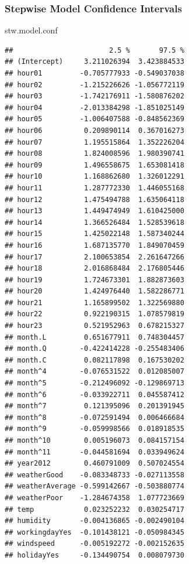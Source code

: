\documentclass[american,]{article}
\newenvironment{Shaded}{\begin{snugshade}}{\end{snugshade}}
\newcommand{\NormalTok}[1]{#1}
\begin{document}
\newpage

\hypertarget{stepwise-model-confidence-intervals}{%
\subsubsection{Stepwise Model Confidence Intervals}\label{stepwise-model-confidence-intervals}}

\begin{Shaded}
\begin{Highlighting}[]
\NormalTok{stw.model.conf}
\end{Highlighting}
\end{Shaded}

\begin{verbatim}
##                       2.5 %       97.5 %
## (Intercept)     3.211026394  3.423884533
## hour01         -0.705777933 -0.549037038
## hour02         -1.215226626 -1.056772119
## hour03         -1.742176911 -1.580876202
## hour04         -2.013384298 -1.851025149
## hour05         -1.006407588 -0.848562369
## hour06          0.209890114  0.367016273
## hour07          1.195515864  1.352226204
## hour08          1.824008596  1.980390741
## hour09          1.496558675  1.653081418
## hour10          1.168862680  1.326012291
## hour11          1.287772330  1.446055168
## hour12          1.475494788  1.635064118
## hour13          1.449474949  1.610425000
## hour14          1.366526484  1.528539618
## hour15          1.425022148  1.587340244
## hour16          1.687135770  1.849070459
## hour17          2.100653854  2.261647266
## hour18          2.016868484  2.176805446
## hour19          1.724673301  1.882873603
## hour20          1.424976440  1.582286771
## hour21          1.165899502  1.322569880
## hour22          0.922190315  1.078579819
## hour23          0.521952963  0.678215327
## month.L         0.651677911  0.748304457
## month.Q        -0.422414228 -0.255483406
## month.C         0.082117898  0.167530202
## month^4        -0.076531522  0.012085007
## month^5        -0.212496092 -0.129869713
## month^6        -0.033922711  0.045587412
## month^7         0.121395096  0.201391945
## month^8        -0.072591494  0.006466684
## month^9        -0.059998566  0.018918535
## month^10        0.005196073  0.084157154
## month^11       -0.044581694  0.033949624
## year2012        0.460791009  0.507024554
## weatherGood    -0.083348733 -0.027113558
## weatherAverage -0.599142667 -0.503880774
## weatherPoor    -1.284674358  1.077723669
## temp            0.023252232  0.030254717
## humidity       -0.004136865 -0.002490104
## workingdayYes  -0.101438121 -0.050984345
## windspeed      -0.005192272 -0.002152635
## holidayYes     -0.134490754  0.008079730
\end{verbatim}
\end{document}
